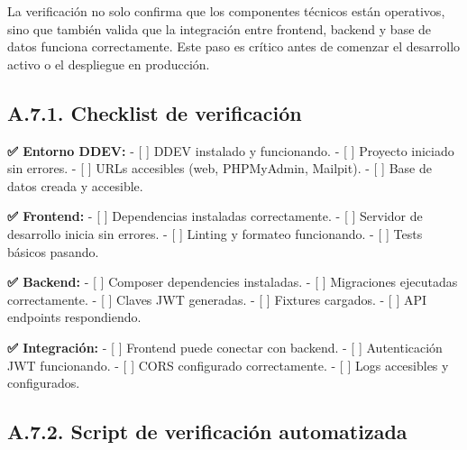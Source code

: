 \documentclass[12pt,a4paper,oneside]{report}
\begin{document}
La verificación no solo confirma que los componentes técnicos están operativos, sino que también valida que la integración entre frontend, backend y base de datos funciona correctamente. Este paso es crítico antes de comenzar el desarrollo activo o el despliegue en producción.

\subsection{A.7.1. Checklist de
verificación}\label{a.7.1.-checklist-de-verificaciuxf3n}

\textbf{✅ Entorno DDEV:} - {[} {]} DDEV instalado y funcionando. - {[}
{]} Proyecto iniciado sin errores. - {[} {]} URLs accesibles (web,
PHPMyAdmin, Mailpit). - {[} {]} Base de datos creada y accesible.

\textbf{✅ Frontend:} - {[} {]} Dependencias instaladas correctamente. -
{[} {]} Servidor de desarrollo inicia sin errores. - {[} {]} Linting y
formateo funcionando. - {[} {]} Tests básicos pasando.

\textbf{✅ Backend:} - {[} {]} Composer dependencies instaladas. - {[}
{]} Migraciones ejecutadas correctamente. - {[} {]} Claves JWT
generadas. - {[} {]} Fixtures cargados. - {[} {]} API endpoints
respondiendo.

\textbf{✅ Integración:} - {[} {]} Frontend puede conectar con backend.
- {[} {]} Autenticación JWT funcionando. - {[} {]} CORS configurado
correctamente. - {[} {]} Logs accesibles y configurados.

\subsection{A.7.2. Script de verificación
automatizada}\label{a.7.2.-script-de-verificaciuxf3n-automatizada}
\end{document}
